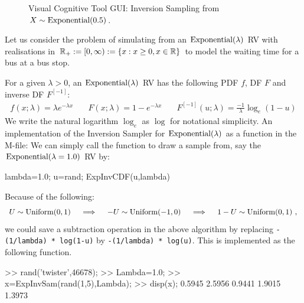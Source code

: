 \begin{figure}[htpb]
\caption{Visual Cognitive Tool GUI: Inversion Sampling from $X \sim \mbox{{\rm Exponential}}(0.5)$.\label{F:guiInversionSamplerExponential}}
\centering   {}
\end{figure}

Let us consider the problem of simulating from an $\exponential(\lambda)$ RV with realisations in $\mathbb{R}_+ := [0,\infty) := \{x: x \geq 0, x \in \mathbb{R}\}$ to model the waiting time for a bus at a bus stop.
\begin{simulation}[$\exponential(\lambda)$]\label{SIM:Exponential}
For a given $\lambda > 0$, an $\exponential(\lambda)$ RV has the following PDF $f$, DF $F$ and inverse DF $F^{[-1]}$:
\begin{eqnarray}
f(x; \lambda) = \lambda e^{-\lambda x} \quad &
F(x; \lambda)= 1-e^{-\lambda x} \quad &
F^{[-1]}(u; \lambda)= \frac{-1}{\lambda} \log_e (1-u)
\end{eqnarray}
We write the natural logarithm $\log_e$ as $\log$ for notational simplicity.  An implementation of the Inversion Sampler for $\exponential(\lambda)$ as a function in the M-file:
We can simply call the function to draw a sample from, say the $\mbox{{\rm Exponential}}(\lambda=1.0)$ RV by:
\begin{VrbM}
  lambda=1.0;			%
  u=rand;			%
  ExpInvCDF(u,lambda)	%
\end{VrbM}
Because of the following:
\[
 U \sim \mbox{{\rm Uniform}}(0,1) \quad \implies \quad
 -U \sim \mbox{{\rm Uniform}}(-1,0) \quad \implies \quad
 1-U \sim \mbox{{\rm Uniform}}(0,1)  \  ,
 \]
 we could save a subtraction operation in the above algorithm by replacing {\tt -(1/lambda) * log(1-u)} by {\tt -(1/lambda) * log(u)}.  This is implemented as the following function.
\begin{VrbM}
>> rand('twister',46678); %
>> Lambda=1.0;  %
>> x=ExpInvSam(rand(1,5),Lambda); %
>> disp(x); %
    0.5945    2.5956    0.9441    1.9015    1.3973
\end{VrbM}
\end{simulation}


